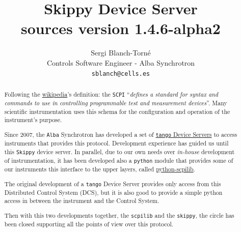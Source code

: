 \documentclass[a4paper,10pt]{article}
\title{Skippy Device Server \\
\large sources version 1.4.6-alpha2}
\author{Sergi Blanch-Torn\'e\\\small{Controls Software Engineer - Alba Synchrotron}\\{\tt \small{sblanch@cells.es}}}
\begin{document}
\maketitle

\begin{abstract}
Following the \href{https://en.wikipedia.org/wiki/Standard_Commands_for_Programmable_Instruments}{wikipedia}'s definition:  the \texttt{SCPI} ``\emph{defines a standard for syntax and commands to use in controlling programmable test and measurement devices}''. Many scientific instrumentation uses this schema for the configuration and operation of the instrument's purpose.

Since 2007, the \texttt{Alba} Synchrotron has developed a set of \href{http://tango.controls.org}{\texttt{tango} Device Servers} to access instruments that provides this protocol. Development experience has guided us until this \texttt{Skippy} device server. In parallel, due to our own needs over \emph{in-house} development of instrumentation, it has been developed also a \texttt{python} module that provides some of our instruments this interface to the upper layers, called \href{https://github.com/srgblnch/python-scpilib}{python-scpilib}.

The original development of a \texttt{tango} Device Server provides only access from this Distributed Control System (DCS), but it is also good to provide a simple python access in between the instrument and the Control System.

Then with this two developments together, the \texttt{scpilib} and the \texttt{skippy}, the circle has been closed supporting all the points of view over this protocol.


\end{abstract}
\end{document}
